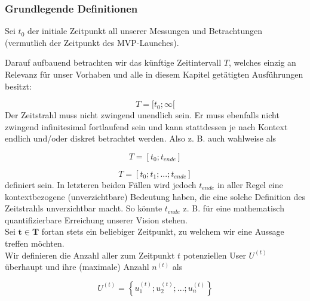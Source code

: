 
\subsubsection{Grundlegende Definitionen}
\label{sec:eco_zahlen_def}

Sei $t_0$ der initiale Zeitpunkt all unserer Messungen und Betrachtungen (vermutlich der Zeitpunkt des MVP-Launches).

Darauf aufbauend betrachten wir das künftige Zeitintervall $T$, welches einzig an Relevanz für unser Vorhaben und alle in diesem Kapitel getätigten Ausführungen besitzt:

\begin{equation*}
  T = [t_0; \infty[
\end{equation*}
Der Zeitstrahl muss nicht zwingend unendlich sein. Er muss ebenfalls nicht zwingend infinitesimal fortlaufend sein und kann stattdessen je nach Kontext endlich und/oder diskret betrachtet werden. Also z. B. auch wahlweise als 

\begin{equation*}
  T = [t_0; t_{ende}]
\end{equation*}

\begin{equation*}
  T = [t_0; t_1;...; t_{ende}]
\end{equation*}
definiert sein. In letzteren beiden Fällen wird jedoch $t_{ende}$ in aller Regel eine kontextbezogene (unverzichtbare) Bedeutung haben, die eine solche Definition des Zeitstrahls unverzichtbar macht. So könnte $t_{ende}$ z. B. für eine mathematisch quantifizierbare Erreichung unserer Vision stehen. \\

Sei $\mathbf{t \in T}$ fortan stets ein beliebiger Zeitpunkt, zu welchem wir eine Aussage treffen möchten. \\


Wir definieren die Anzahl aller zum Zeitpunkt $t$ potenziellen User $U^{(t)}$ überhaupt und ihre (maximale) Anzahl $n^{(t)}$ als \\

\begin{Def}\label{defU}
\begin{equation*}
  U^{(t)} = \left\{ u^{(t)}_1; u^{(t)}_2;...; u^{(t)}_{n} \right\}
\end{equation*}
\end{Def} 

\vspace{0.3cm}


